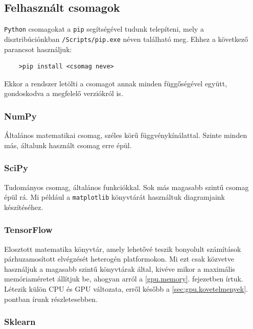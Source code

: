 \subsection{Felhasznált csomagok}

\texttt{Python} csomagokat a \texttt{pip}\cite{pip} segítségével tudunk telepíteni, mely a 
disztribúciónkban \texttt{/Scripts/pip.exe} néven található meg. Ehhez a következő parancsot
használjuk:

\begin{lstlisting}  
	>pip install <csomag neve>
\end{lstlisting}

Ekkor a rendszer letölti a csomagot annak minden függőségével együtt, gondoskodva a megfelelő
verziókról is. 

\subsubsection{NumPy\cite{numpy}}

Általános matematikai csomag, széles körű függvénykínálattal.
Szinte minden más, általunk használt csomag erre épül.


\subsubsection{SciPy\cite{scipy}}

Tudományos csomag, általános funkciókkal. Sok más magasabb szintű csomag épül rá. Mi például
a \texttt{matplotlib} könyvtárát használtuk diagramjaink készítéséhez.


\subsubsection{TensorFlow\cite{tensorflow}}

Elosztott matematika könyvtár, amely lehetővé teszik bonyolult számítások párhuzamosított
elvégzését heterogén platformokon. Mi ezt csak közvetve használjuk a magasabb szintű 
könyvtárak által, kivéve mikor a maximális memóriaméretet állítjuk be, ahogyan arról a 
\ref{gpu.memory}. fejezetben írtuk. Létezik külön CPU és GPU változata, erről később a 
\ref{sec:gpu.kovetelmenyek}. pontban írunk részletesebben.



\subsubsection{Sklearn\cite{sklearn}} 


